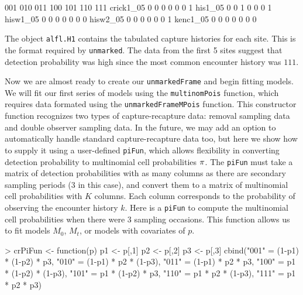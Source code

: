 \documentclass[a4paper]{article}
\renewenvironment{Schunk}{\vspace{\topsep}}{\vspace{\topsep}}
\begin{document}
\begin{Schunk}
\begin{Soutput}
            001 010 011 100 101 110 111
  crick1_05   0   0   0   0   0   0   1
  his1_05     0   0   1   0   0   0   1
  hisw1_05    0   0   0   0   0   0   0
  hisw2_05    0   0   0   0   0   0   1
  kenc1_05    0   0   0   0   0   0   0
\end{Soutput}
\end{Schunk}
The object \texttt{alfl.H1} contains the tabulated capture histories for
each site. This is the format required by {\tt unmarked}. The data from
the first 5 sites
suggest that detection probability was high since the most
common encounter history was $111$.

Now we are almost ready to create our \texttt{unmarkedFrame} and begin
fitting models. We will fit our first series of models using the
\texttt{multinomPois} function, which requires data formated using the
\texttt{unmarkedFrameMPois} function. This constructor function
recognizes two types of capture-recapture data: removal sampling
data and double observer sampling data. In the future, we may add an
option to automatically handle standard capture-recapture data too,
but here we show how to supply it using a user-defined \texttt{piFun},
which allows flexibility in converting detection probability
to multinomial cell probabilities $\bf \pi$. The \texttt{piFun} must
take a matrix of detection probabilities with as many columns as there
are secondary sampling periods (3 in this case), and convert them to a
matrix of multinomial
cell probabilities with $K$ columns. Each column corresponds to the
probability of observing the encounter history $k$. Here is a
\texttt{piFun} to compute the multinomial cell probabilities when there
were 3 sampling occasions. This function allows us to fit models
$M_0$, $M_t$, or models with covariates of $p$.

\begin{Schunk}
\begin{Sinput}
> crPiFun <- function(p) {
     p1 <- p[,1]
     p2 <- p[,2]
     p3 <- p[,3]
     cbind("001" = (1-p1) * (1-p2) * p3,
           "010" = (1-p1) * p2     * (1-p3),
           "011" = (1-p1) * p2     * p3,
           "100" = p1     * (1-p2) * (1-p3),
           "101" = p1     * (1-p2) * p3,
           "110" = p1     * p2     * (1-p3),
           "111" = p1     * p2     * p3)
 }
\end{Sinput}
\end{Schunk}
\end{document}
